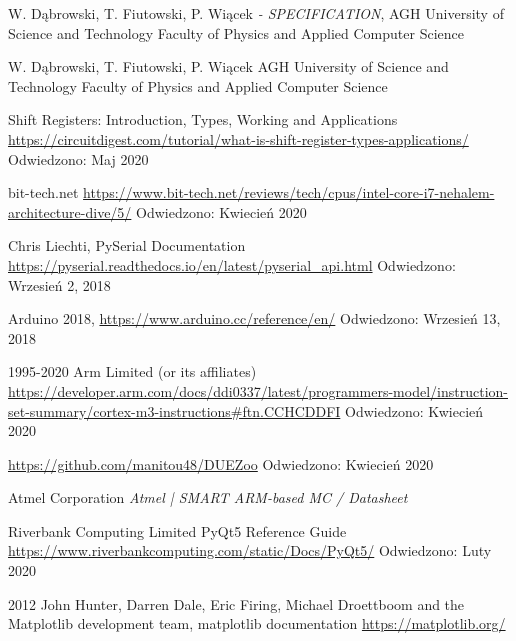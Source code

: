 \begin{thebibliography}{99}
                W. Dąbrowski, T. Fiutowski, P. Wiącek 
                \textit{ - SPECIFICATION},
                AGH University of Science and Technology
        Faculty of Physics and Applied Computer Science 

                W. Dąbrowski, T. Fiutowski, P. Wiącek 
        \textit{}
        AGH University of Science and Technology
        Faculty of Physics and Applied Computer Science 

        Shift Registers: Introduction, Types, Working and Applications
        \url{https://circuitdigest.com/tutorial/what-is-shift-register-types-applications/}
        Odwiedzono: Maj 2020

        bit-tech.net
        \url{https://www.bit-tech.net/reviews/tech/cpus/intel-core-i7-nehalem-architecture-dive/5/}
        Odwiedzono:
        Kwiecień 2020

        Chris Liechti,	
        PySerial Documentation
        \url{https://pyserial.readthedocs.io/en/latest/pyserial_api.html}
        Odwiedzono: Wrzesień 2, 2018
        
                Arduino 2018,
                \url{https://www.arduino.cc/reference/en/}
        Odwiedzono: Wrzesień 13, 2018	 
        
        1995-2020 Arm Limited (or its affiliates)
        \url{https://developer.arm.com/docs/ddi0337/latest/programmers-model/instruction-set-summary/cortex-m3-instructions#ftn.CCHCDDFI}
        Odwiedzono: Kwiecień 2020

        \url{https://github.com/manitou48/DUEZoo}
        Odwiedzono: Kwiecień 2020

        Atmel Corporation
        \textit{Atmel | SMART ARM-based MC  / Datasheet}

        Riverbank Computing Limited
        PyQt5 Reference Guide
        \url{https://www.riverbankcomputing.com/static/Docs/PyQt5/}
        Odwiedzono: Luty 2020

        2012 John Hunter, Darren Dale, Eric Firing, Michael Droettboom and the Matplotlib development team,
        matplotlib documentation
        \url{https://matplotlib.org/}


\end{thebibliography}
